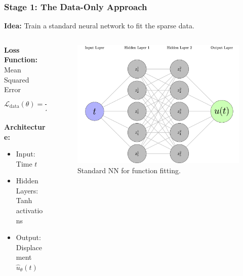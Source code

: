 \documentclass[notes]{beamer}
\begin{document}
\begin{frame}
\frametitle{Stage 1: The Data-Only Approach}

\textbf{Idea:} Train a standard neural network to fit the sparse data.

\begin{columns}[T]
    \begin{column}{0.5\textwidth}
        \textbf{Loss Function:} Mean Squared Error
        \begin{equation*}
        \mathcal{L}_{\text{data}}(\theta) = \frac{1}{N} \sum_{i=1}^N |\hat{u}_\theta(t_i) - u_i|^2
        \end{equation*}
        
        \textbf{Architecture:}
        \begin{itemize}
            \item Input: Time $t$
            \item Hidden Layers: Tanh activations
            \item Output: Displacement $\hat{u}_\theta(t)$
        \end{itemize}
    \end{column}
    \begin{column}{0.5\textwidth}
        \begin{figure}[ht]
            \centering
            \includegraphics[width=\linewidth]{figs/oscillator-nn.png}
            \caption*{Standard NN for function fitting.}
        \end{figure}
    \end{column}
\end{columns}

\end{frame}
\end{document}
